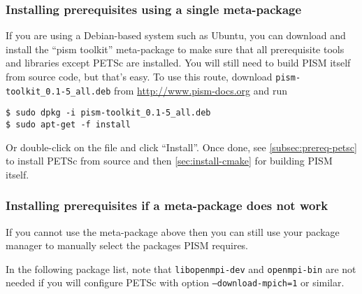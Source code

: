 \documentclass[titlepage,letterpaper,final]{scrartcl}
\begin{document}
\subsubsection{Installing prerequisites using a single meta-package}
\label{sec:deb-pism-toolkit}

If you are using a Debian-based system such as Ubuntu, you can download and
install the ``pism toolkit'' meta-package to make sure that all prerequisite
tools and libraries except PETSc are installed.  You will still need to
build PISM itself from source code, but that's easy.  To use this route, download
\texttt{pism-toolkit_0.1-5_all.deb} from \url{http://www.pism-docs.org} and run
\begin{verbatim}
$ sudo dpkg -i pism-toolkit_0.1-5_all.deb
$ sudo apt-get -f install
\end{verbatim}%
Or double-click on the file and click ``Install''.  Once done, see
\ref{subsec:prereq-petsc} to install PETSc from source and then
\ref{sec:install-cmake} for building PISM itself.


\subsubsection{Installing prerequisites if a meta-package does not work}
\label{sec:deb-libraries-by-hand}

If you cannot use the meta-package above then you can still use your
package manager to manually select the packages PISM requires.

In the following package list, note that \texttt{libopenmpi-dev} and
\texttt{openmpi-bin} are not needed if you will configure PETSc with
option \texttt{--download-mpich=1} or similar.
\end{document}
